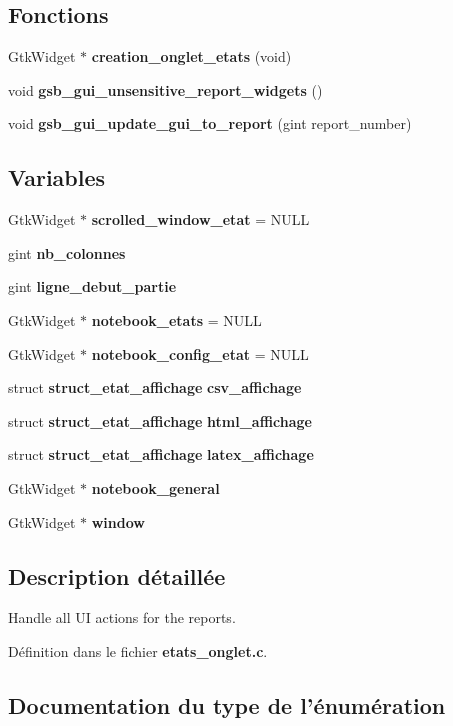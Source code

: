 \subsection*{Fonctions}
\begin{DoxyCompactItemize}
\item 
GtkWidget $\ast$ {\bf creation\_\-onglet\_\-etats} (void)
\item 
void {\bf gsb\_\-gui\_\-unsensitive\_\-report\_\-widgets} ()
\item 
void {\bf gsb\_\-gui\_\-update\_\-gui\_\-to\_\-report} (gint report\_\-number)
\end{DoxyCompactItemize}
\subsection*{Variables}
\begin{DoxyCompactItemize}
\item 
GtkWidget $\ast$ {\bf scrolled\_\-window\_\-etat} = NULL
\item 
gint {\bf nb\_\-colonnes}
\item 
gint {\bf ligne\_\-debut\_\-partie}
\item 
GtkWidget $\ast$ {\bf notebook\_\-etats} = NULL
\item 
GtkWidget $\ast$ {\bf notebook\_\-config\_\-etat} = NULL
\item 
struct {\bf struct\_\-etat\_\-affichage} {\bf csv\_\-affichage}
\item 
struct {\bf struct\_\-etat\_\-affichage} {\bf html\_\-affichage}
\item 
struct {\bf struct\_\-etat\_\-affichage} {\bf latex\_\-affichage}
\item 
GtkWidget $\ast$ {\bf notebook\_\-general}
\item 
GtkWidget $\ast$ {\bf window}
\end{DoxyCompactItemize}


\subsection{Description détaillée}
Handle all UI actions for the reports. 

Définition dans le fichier {\bf etats\_\-onglet.c}.



\subsection{Documentation du type de l'énumération}
